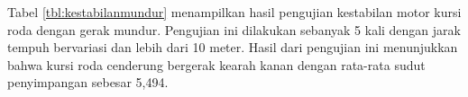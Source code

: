   Tabel \ref{tbl:kestabilanmundur} menampilkan hasil pengujian kestabilan motor kursi roda dengan gerak mundur. Pengujian ini dilakukan sebanyak 5 kali dengan jarak tempuh bervariasi dan lebih dari 10 meter. Hasil dari pengujian ini menunjukkan bahwa kursi roda cenderung bergerak kearah kanan dengan rata-rata sudut penyimpangan sebesar 5,494\textdegree.